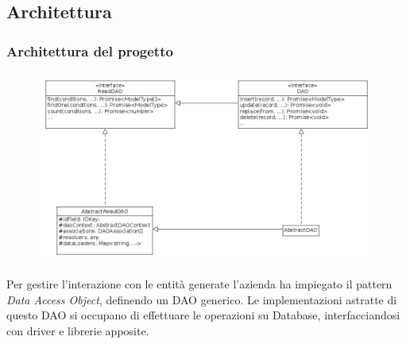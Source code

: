 \documentclass[c]{beamer}
\begin{document}
        \subsection{Architettura}
            \begin{frame}
                \frametitle{Architettura del progetto}
                \begin{figure}
                    \includegraphics[scale=0.26]{../prototype-architecture.png}
                \end{figure}
                Per gestire l'interazione con le entità generate l'azienda ha impiegato il pattern \emph{Data Access Object}, definendo un DAO generico.
                \vfill
                Le implementazioni astratte di questo DAO si occupano di effettuare le operazioni su Database, interfacciandosi con driver e librerie apposite.
            \end{frame}
\end{document}
